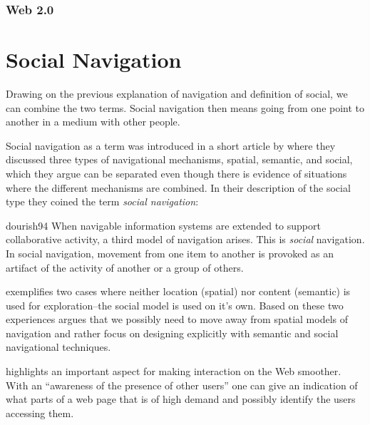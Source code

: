 \subsubsection{Web 2.0}

\section{Social Navigation}
\label{section:background.social.navigation}
Drawing on the previous explanation of navigation and definition of social, we
can combine the two terms. Social navigation then means going from one point
to another in a medium with other people.

Social navigation as a term was introduced in a short article by
\citet{dourish94} where they discussed three types of navigational mechanisms,
spatial, semantic, and social, which they argue can be separated even though
there is evidence of situations where the different mechanisms are combined.
In their description of the social type they coined the term
\emph{social navigation}:

\begin{citequote}[p.~1]{dourish94}
  When navigable information systems are extended to support collaborative
  activity, a third model of navigation arises. This is \emph{social}
  navigation. In social navigation, movement from one item to another is
  provoked as an artifact of the activity of another or a group of others.
\end{citequote}

\citeauthor{dourish94} exemplifies two cases where neither location
(spatial) nor content (semantic) is used for exploration--the social model
is used on it's own. Based on these two experiences \citeauthor{dourish94}
argues that we possibly need to move away from spatial models of navigation
and rather focus on designing explicitly with semantic and social navigational
techniques.

\citeauthor{dieberger97} highlights an important aspect for making interaction
on the Web smoother. With an ``awareness of the presence of
other users'' \citeyearpar[p.~812]{dieberger97} one can give an indication of
what parts of a web page that is of high demand and possibly identify the
users accessing them.

